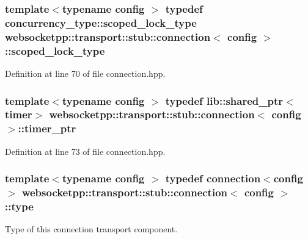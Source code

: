 \subsubsection[{scoped\+\_\+lock\+\_\+type}]{\setlength{\rightskip}{0pt plus 5cm}template$<$typename config $>$ typedef concurrency\+\_\+type\+::scoped\+\_\+lock\+\_\+type {\bf websocketpp\+::transport\+::stub\+::connection}$<$ config $>$\+::{\bf scoped\+\_\+lock\+\_\+type}}\label{classwebsocketpp_1_1transport_1_1stub_1_1connection_aa47474957b35f4d2deab44c644378615}


Definition at line 70 of file connection.\+hpp.

\hypertarget{classwebsocketpp_1_1transport_1_1stub_1_1connection_a905c3e6ee1e0245190b77786058482f6}{}
\subsubsection[{timer\+\_\+ptr}]{\setlength{\rightskip}{0pt plus 5cm}template$<$typename config $>$ typedef lib\+::shared\+\_\+ptr$<${\bf timer}$>$ {\bf websocketpp\+::transport\+::stub\+::connection}$<$ config $>$\+::{\bf timer\+\_\+ptr}}\label{classwebsocketpp_1_1transport_1_1stub_1_1connection_a905c3e6ee1e0245190b77786058482f6}


Definition at line 73 of file connection.\+hpp.

\hypertarget{classwebsocketpp_1_1transport_1_1stub_1_1connection_aea021b08326f47630e97f01af1bfccc7}{}
\subsubsection[{type}]{\setlength{\rightskip}{0pt plus 5cm}template$<$typename config $>$ typedef {\bf connection}$<$config$>$ {\bf websocketpp\+::transport\+::stub\+::connection}$<$ config $>$\+::{\bf type}}\label{classwebsocketpp_1_1transport_1_1stub_1_1connection_aea021b08326f47630e97f01af1bfccc7}


Type of this connection transport component. 




